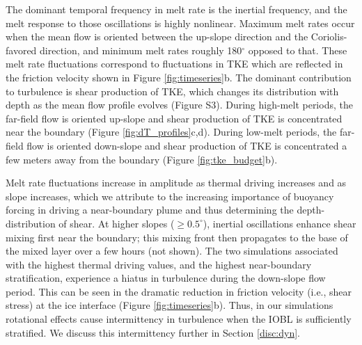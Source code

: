 \documentclass[draft]{agujournal2019}
\begin{document}
The dominant temporal frequency in melt rate is the inertial frequency, and the melt response to those oscillations is highly nonlinear. Maximum melt rates occur when the mean flow is oriented between the up-slope direction and the Coriolis-favored direction, and minimum melt rates roughly 180$^{\circ}$ opposed to that. These melt rate fluctuations correspond to fluctuations in TKE which are reflected in the friction velocity shown in Figure \ref{fig:timeseries}b. The dominant contribution to turbulence is shear production of TKE, which changes its distribution with depth as the mean flow profile evolves (Figure S3). During high-melt periods, the far-field flow is oriented up-slope and shear production of TKE is concentrated near the boundary (Figure \ref{fig:dT_profiles}c,d). During low-melt periods, the far-field flow is oriented down-slope and shear production of TKE is concentrated a few meters away from the boundary (Figure \ref{fig:tke_budget}b). 

Melt rate fluctuations increase in amplitude as thermal driving increases and as slope increases, which we attribute to the increasing importance of buoyancy forcing in driving a near-boundary plume and thus determining the depth-distribution of shear. At higher slopes ($\geq 0.5^{\circ}$), inertial oscillations enhance shear mixing first near the boundary; this mixing front then propagates to the base of the mixed layer over a few hours (not shown). The two simulations associated with the highest thermal driving values, and the highest near-boundary stratification, experience a hiatus in turbulence during the down-slope flow period. This can be seen in the dramatic reduction in friction velocity (i.e., shear stress) at the ice interface (Figure \ref{fig:timeseries}b). Thus, in our simulations rotational effects cause intermittency in turbulence when the IOBL is sufficiently stratified. We discuss this intermittency further in Section \ref{disc:dyn}.
\end{document}
